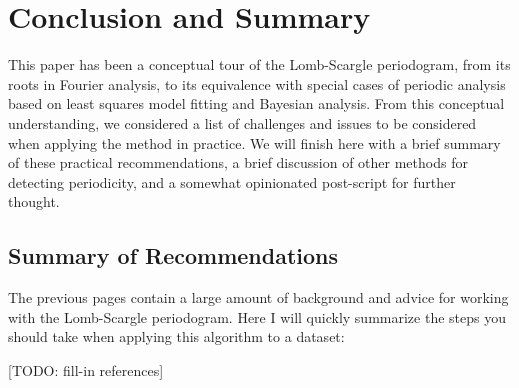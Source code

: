 \documentclass[preprint]{aastex}
\newcommand{\todo}[1]{{\color{red} [TODO: #1]}}
\newcommand{\sectlabel}[1]{\label{sect:#1}}
\begin{document}
\section{Conclusion and Summary}
\sectlabel{conclusion}

This paper has been a conceptual tour of the Lomb-Scargle periodogram, from
its roots in Fourier analysis, to its equivalence with special cases of
periodic analysis based on least squares model fitting and Bayesian
analysis.
From this conceptual understanding, we considered a list of challenges
and issues to be considered when applying the method in practice.
We will finish here with a brief summary of these practical
recommendations, a brief discussion of other methods for detecting
periodicity, and a somewhat opinionated
post-script for further thought.

\subsection{Summary of Recommendations}
\sectlabel{summary}
The previous pages contain a large amount of background and advice for working
with the Lomb-Scargle periodogram.
Here I will quickly summarize the steps you should take when applying this
algorithm to a dataset:

\todo{fill-in references}
\end{document}
